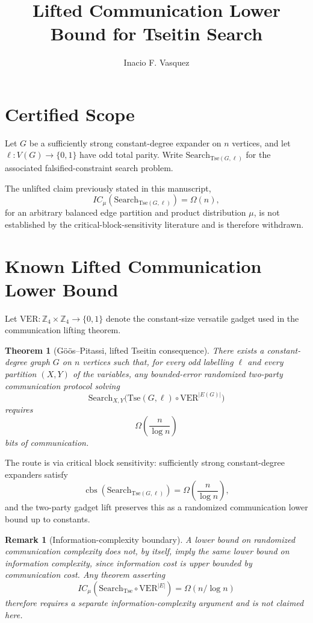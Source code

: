 \documentclass[11pt]{article}
\title{Lifted Communication Lower Bound for Tseitin Search}
\author{Inacio F. Vasquez}
\date{}
\newtheorem{theorem}{Theorem}
\newtheorem{remark}{Remark}
\begin{document}
\maketitle

\section*{Certified Scope}

Let $G$ be a sufficiently strong constant-degree expander on $n$ vertices,
and let $\ell:V(G)\to\{0,1\}$ have odd total parity.  Write
$\mathrm{Search}_{\mathrm{Tse}(G,\ell)}$ for the associated falsified-constraint
search problem.

The unlifted claim previously stated in this manuscript,
\[
IC_\mu(\mathrm{Search}_{\mathrm{Tse}(G,\ell)})=\Omega(n),
\]
for an arbitrary balanced edge partition and product distribution $\mu$, is
not established by the critical-block-sensitivity literature and is therefore
withdrawn.

\section*{Known Lifted Communication Lower Bound}

Let $\mathrm{VER}:\mathbb Z_4\times\mathbb Z_4\to\{0,1\}$ denote the constant-size
versatile gadget used in the communication lifting theorem.

\begin{theorem}[G\"o\"os--Pitassi, lifted Tseitin consequence]
There exists a constant-degree graph $G$ on $n$ vertices such that, for every
odd labelling $\ell$ and every partition $(X,Y)$ of the variables, any
bounded-error randomized two-party communication protocol solving
\[
\mathrm{Search}_{X,Y}
\bigl(\mathrm{Tse}(G,\ell)\circ \mathrm{VER}^{|E(G)|}\bigr)
\]
requires
\[
\Omega\!\left(\frac{n}{\log n}\right)
\]
bits of communication.
\end{theorem}

The route is via critical block sensitivity: sufficiently strong
constant-degree expanders satisfy
\[
\operatorname{cbs}(\mathrm{Search}_{\mathrm{Tse}(G,\ell)})
=\Omega\!\left(\frac{n}{\log n}\right),
\]
and the two-party gadget lift preserves this as a randomized communication
lower bound up to constants.

\begin{remark}[Information-complexity boundary]
A lower bound on randomized communication complexity does not, by itself,
imply the same lower bound on information complexity, since information cost
is upper bounded by communication cost.  Any theorem asserting
\[
IC_\mu(\mathrm{Search}_{\mathrm{Tse}}\circ \mathrm{VER}^{|E|})
=\Omega(n/\log n)
\]
therefore requires a separate information-complexity argument and is not
claimed here.
\end{remark}
\end{document}
